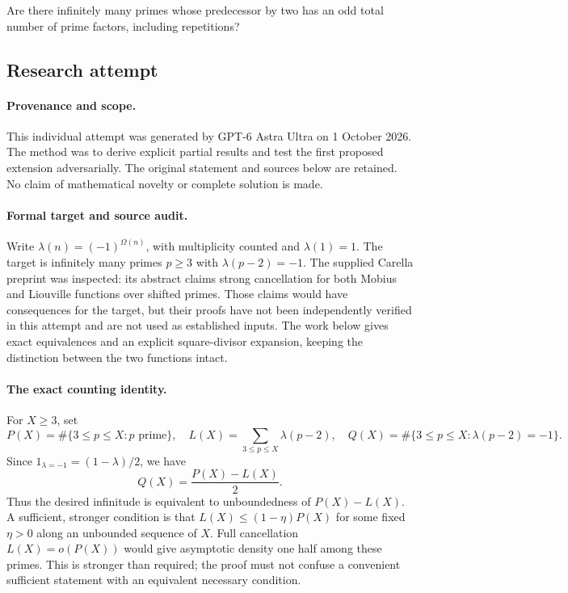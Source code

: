 \documentclass[11pt,a4paper]{article}
\begin{document}
Are there infinitely many primes whose predecessor by two has an odd total number of prime factors, including repetitions?

\subsection{Research attempt}

\paragraph{Provenance and scope.}
This individual attempt was generated by GPT-6 Astra Ultra on 1 October 2026. The method was to derive explicit partial results and test the first proposed extension adversarially. The original statement and sources below are retained. No claim of mathematical novelty or complete solution is made.

\paragraph{Formal target and source audit.}
Write $\lambda(n)=(-1)^{\Omega(n)}$, with multiplicity counted and $\lambda(1)=1$. The target is infinitely many primes $p\geq3$ with $\lambda(p-2)=-1$. The supplied Carella preprint was inspected: its abstract claims strong cancellation for both Mobius and Liouville functions over shifted primes. Those claims would have consequences for the target, but their proofs have not been independently verified in this attempt and are not used as established inputs. The work below gives exact equivalences and an explicit square-divisor expansion, keeping the distinction between the two functions intact.

\paragraph{The exact counting identity.}
For $X\geq3$, set
\[
 P(X)=\#\{3\leq p\leq X:p\text{ prime}\},\quad
 L(X)=\sum_{3\leq p\leq X}\lambda(p-2),\quad
 Q(X)=\#\{3\leq p\leq X:\lambda(p-2)=-1\}.
\]
Since $1_{\lambda=-1}=(1-\lambda)/2$, we have
\[
 Q(X)=\frac{P(X)-L(X)}2.
\]
Thus the desired infinitude is equivalent to unboundedness of $P(X)-L(X)$. A sufficient, stronger condition is that $L(X)\leq(1-\eta)P(X)$ for some fixed $\eta>0$ along an unbounded sequence of $X$. Full cancellation $L(X)=o(P(X))$ would give asymptotic density one half among these primes. This is stronger than required; the proof must not confuse a convenient sufficient statement with an equivalent necessary condition.
\end{document}
